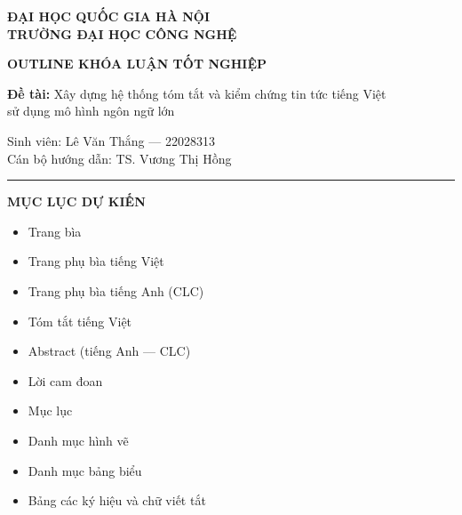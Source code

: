 \documentclass[a4paper,12pt]{article}
\begin{document}
\begin{center}
{\fontsize{12pt}{14pt}\selectfont\bfseries
ĐẠI HỌC QUỐC GIA HÀ NỘI \\
TRƯỜNG ĐẠI HỌC CÔNG NGHỆ}

\vspace{0.8cm}

{\fontsize{14pt}{16pt}\selectfont\bfseries
OUTLINE KHÓA LUẬN TỐT NGHIỆP}

\vspace{0.4cm}

{\fontsize{13pt}{15pt}\selectfont
\textbf{Đề tài:} Xây dựng hệ thống tóm tắt và kiểm chứng tin tức tiếng Việt \\
sử dụng mô hình ngôn ngữ lớn}

\vspace{0.3cm}

{\fontsize{13pt}{15pt}\selectfont
Sinh viên: Lê Văn Thắng — 22028313 \\
Cán bộ hướng dẫn: TS. Vương Thị Hồng}

\end{center}

\vspace{0.5cm}
\noindent\rule{\textwidth}{0.5pt}
\vspace{0.3cm}

{\fontsize{13pt}{15pt}\selectfont\bfseries MỤC LỤC DỰ KIẾN}

\vspace{0.4cm}

\begin{itemize}[leftmargin=0.5cm, labelsep=0.3cm, itemsep=2pt]
  \item[] Trang bìa
  \item[] Trang phụ bìa tiếng Việt
  \item[] Trang phụ bìa tiếng Anh (CLC)
  \item[] Tóm tắt tiếng Việt
  \item[] Abstract (tiếng Anh — CLC)
  \item[] Lời cam đoan
  \item[] Mục lục
  \item[] Danh mục hình vẽ
  \item[] Danh mục bảng biểu
  \item[] Bảng các ký hiệu và chữ viết tắt
\end{itemize}

\vspace{0.5cm}
\end{document}
